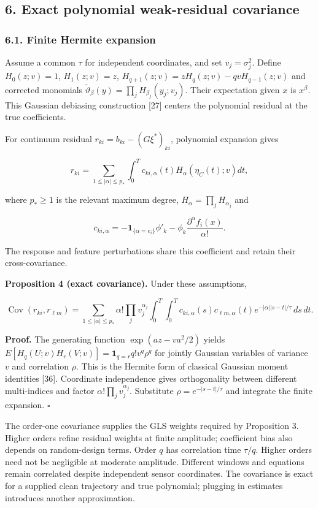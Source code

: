 \documentclass[
  american,
  11pt,
]{article}
\begin{document}
\subsection{6. Exact polynomial weak-residual
covariance}\label{exact-polynomial-weak-residual-covariance}

\subsubsection{6.1. Finite Hermite
expansion}\label{finite-hermite-expansion}

Assume a common \(\tau\) for independent coordinates, and set
\(v_j=\sigma_j^2\). Define \(H_0(z;v)=1\), \(H_1(z;v)=z\),
\(H_{q+1}(z;v)=zH_q(z;v)-qvH_{q-1}(z;v)\) and corrected monomials
\(\widetilde\vartheta_\beta(y)=\prod_jH_{\beta_j}(y_j;v_j)\). Their
expectation given \(x\) is \(x^\beta\). This Gaussian debiasing
construction {[}27{]} centers the polynomial residual at the true
coefficients.

For continuum residual \(r_{ki}=b_{ki}-(G\xi^*)_{ki}\), polynomial
expansion gives

\[
r_{ki}=\sum_{1\leq|\alpha|\leq p_*}\int_0^Tc_{ki,\alpha}(t)H_\alpha(\eta_C(t);v)dt,
\]

where \(p_*\geq1\) is the relevant maximum degree,
\(H_\alpha=\prod_jH_{\alpha_j}\) and

\[
c_{ki,\alpha}=-\mathbf1_{\{\alpha=e_i\}}\phi'_k
-\phi_k\frac{\partial^\alpha f_i(x)}{\alpha!}.
\]

The response and feature perturbations share this coefficient and retain
their cross-covariance.

\textbf{Proposition 4 (exact covariance).} Under these assumptions,

\[
\operatorname{Cov}(r_{ki},r_{\ell m})=
\sum_{1\leq|\alpha|\leq p_*}\alpha!\prod_jv_j^{\alpha_j}
\int_0^T\int_0^Tc_{ki,\alpha}(s)c_{\ell m,\alpha}(t)
e^{-|\alpha||s-t|/\tau}\,ds\,dt.
\]

\textbf{Proof.} The generating function \(\exp(az-va^2/2)\) yields
\(E[H_q(U;v)H_r(V;v)]=\mathbf1_{q=r}q!v^q\rho^q\) for jointly Gaussian
variables of variance \(v\) and correlation \(\rho\). This is the
Hermite form of classical Gaussian moment identities {[}36{]}.
Coordinate independence gives orthogonality between different
multi-indices and factor \(\alpha!\prod_jv_j^{\alpha_j}\). Substitute
\(\rho=e^{-|s-t|/\tau}\) and integrate the finite expansion. \(\square\)

The order-one covariance supplies the GLS weights required by
Proposition 3. Higher orders refine residual weights at finite
amplitude; coefficient bias also depends on random-design terms. Order
\(q\) has correlation time \(\tau/q\). Higher orders need not be
negligible at moderate amplitude. Different windows and equations remain
correlated despite independent sensor coordinates. The covariance is
exact for a supplied clean trajectory and true polynomial; plugging in
estimates introduces another approximation.
\end{document}

